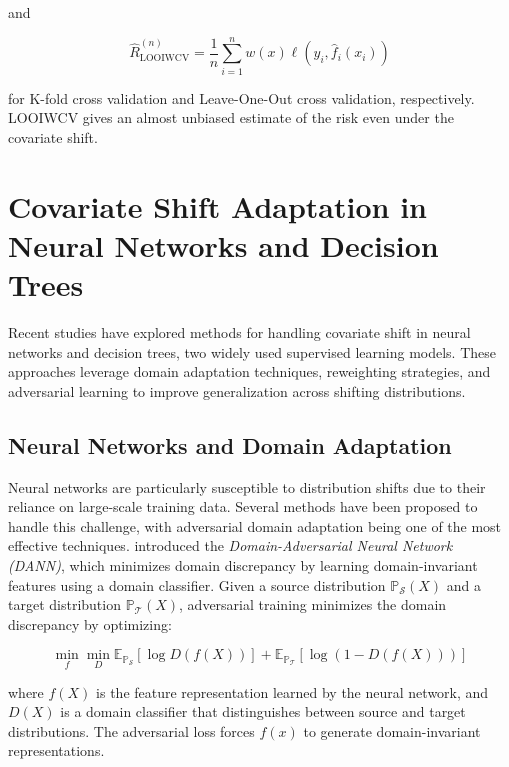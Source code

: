 and

\begin{equation}
    \hat{R}_{\text{LOOIWCV}}^{(n)} = \frac{1}{n} \sum_{i=1}^n w(x) \ell(y_i, \hat{f}_i(x_i))
    \label{eqn:5.6}
\end{equation}

for K-fold cross validation and Leave-One-Out cross validation, respectively. LOOIWCV gives an almost unbiased estimate of the risk even under the covariate shift.

\section{Covariate Shift Adaptation in Neural Networks and Decision Trees}

Recent studies have explored methods for handling covariate shift in neural networks and decision trees, two widely used supervised learning models. These approaches leverage domain adaptation techniques, reweighting strategies, and adversarial learning to improve generalization across shifting distributions.

\subsection{Neural Networks and Domain Adaptation}

Neural networks are particularly susceptible to distribution shifts due to their reliance on large-scale training data. Several methods have been proposed to handle this challenge, with adversarial domain adaptation being one of the most effective techniques. \citep{ganin2016domain} introduced the \emph{Domain-Adversarial Neural Network (DANN)}, which minimizes domain discrepancy by learning domain-invariant features using a domain classifier. Given a source distribution $\mathbb{P}_{\mathcal{S}}(X)$ and a target distribution $\mathbb{P}_{\mathcal{T}}(X)$, adversarial training minimizes the domain discrepancy by optimizing:

\begin{equation}
    \min_{f} \min_{D} \mathbb{E}_{\mathbb{P}_{\mathcal{S}}}[\log D(f(X))] + \mathbb{E}_{\mathbb{P}_{\mathcal{T}}}[\log (1 - D(f(X)))]
    \label{eqn:5.7}
\end{equation}

where $f(X)$ is the feature representation learned by the neural network, and 
$D(X)$ is a domain classifier that distinguishes between source and target distributions. The adversarial loss forces $f(x)$ to generate domain-invariant representations.\\

